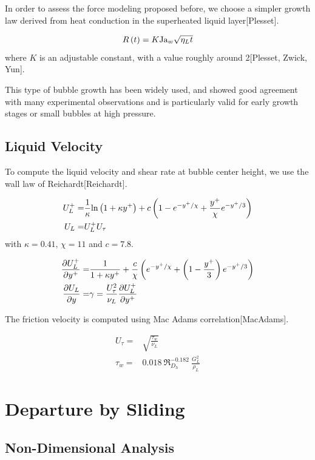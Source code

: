 In order to assess the force modeling proposed before, we choose a simpler growth law derived from heat conduction in the superheated liquid layer[Plesset]. 

\begin{equation}
R\left( t \right) = K\mathrm{Ja}_{w} \sqrt{\eta_{L}t}
\end{equation}
where $K$ is an adjustable constant, with a value roughly around 2[Plesset, Zwick, Yun].

This type of bubble growth has been widely used, and showed good agreement with many experimental observations and is particularly valid for early growth stages or small bubbles at high pressure.


\subsection{Liquid Velocity}\label{subsec:liq_vel}

To compute the liquid velocity and shear rate at bubble center height, we use the wall law of Reichardt[Reichardt].

\begin{align}
U_{L}^{+} =& \frac{1}{\kappa}\ln{1+\kappa y^{+}} + c \parth{1-e^{-y^{+}/\chi} + \frac{y^{+}}{\chi}e^{-y^{+}/3} }\\
%
U_{L}=&U_{L}^{+}U_{\tau}
\end{align}
with $\kappa = 0.41$, $\chi = 11$ and $c=7.8$.

\begin{align}
\dpartial{U_{L}^{+}}{y^{+}} =& \frac{1}{1+\kappa y^{+}}+\frac{c}{\chi}\parth{e^{-y^{+}/\chi} + \parth{1-\frac{y^{+}}{3}}e^{-y^{+}/3}}\\
%
\dpartial{U_{L}}{y} =& \gamma = \frac{U_{\tau}^{2}}{\nu_{L}} \dpartial{U_{L}^{+}}{y^{+}}
\end{align}

The friction velocity is computed using Mac Adams correlation[MacAdams].

\begin{align}
U_{\tau} =& \sqrt{\frac{\tau_{w}}{\nu_{L}}}\\
\tau_{w} =& 0.018~ \Re_{D_{h}}^{-0.182}~ \frac{G_{L}^{2}}{\rho_{L}}
\end{align}

\section{Departure by Sliding}\label{sec:departure}

\subsection{Non-Dimensional Analysis}\label{subsec:adim_dep}

